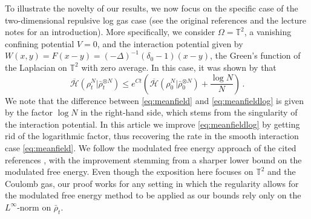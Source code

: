 \documentclass[a4paper,10pt,twoside]{amsart}
\theoremstyle{remark}
\theoremstyle{definition}
\numberwithin{equation}{section}
\newcommand{\T}{\mathbb{T}}
\newcommand{\0}{{\bf 0}}
\newcommand{\+}{\hspace{-.5ex}+\hspace{-.5ex}}
\begin{document}
To illustrate the novelty of our results, we now focus on the specific case of the two-dimensional repulsive log gas case (see the original references \cite{Dys62,Meh04,Mar88,MY80} and the lecture notes \cite{serfaty2024lectures} for an introduction). More specifically,  we consider $\Omega=\T^2$, a vanishing confining potential $V=0$, and the interaction potential  given by $W(x,y)=F(x-y)=(-\Delta)^{-1}(\delta_0-1)(x-y)$, the Green's function of the Laplacian on $\T^2$ with zero average. In this case, it was shown by \cite{serfaty2020mean,BJW19a} that 
\begin{equation}\label{eq:meanfieldlog}
\overline{\mathcal{H}}(\rho^N_t|\bar\rho^{\otimes N}_t)\le e^{Ct}\left(\overline{\mathcal{H}}(\rho^N_{0}|\bar\rho^{\otimes N}_{0})+\frac{\log N}{N}\right)\, .
\end{equation}
We note that the difference between \eqref{eq:meanfield} and \eqref{eq:meanfieldlog} is given by the factor $\log N$ in the right-hand side, which stems from the singularity of the interaction potential. In this article we improve \eqref{eq:meanfieldlog} by getting rid of the logarithmic factor, thus recovering the rate in the smooth interaction case \eqref{eq:meanfield}. We follow the modulated free energy approach of the cited references \cite{serfaty2020mean,BJW19a}, with the improvement stemming from a sharper lower bound on the modulated free energy. Even though the exposition here focuses on $\T^2$ and the Coulomb gas, our proof works for any setting in which the regularity allows for the modulated free energy method to be applied as our bounds rely only on the $L^\infty$-norm on $\bar{\rho}_t$.
\end{document}
